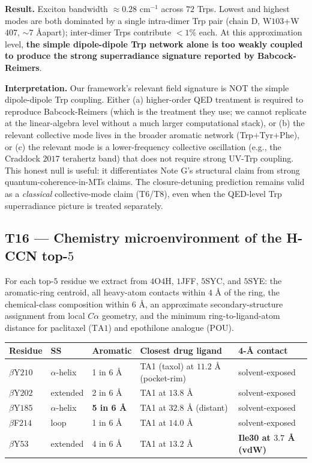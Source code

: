 \documentclass[11pt,a4paper]{article}
\begin{document}
\textbf{Result.} Exciton bandwidth $\approx 0.28$ cm$^{-1}$ across
$72$ Trps. Lowest and highest modes are both dominated by a single
intra-dimer Trp pair (chain D, W$103$+W$407$, $\sim 7$ \AA apart);
inter-dimer Trps contribute $< 1\%$ each. At this approximation
level, \textbf{the simple dipole-dipole Trp network alone is too
weakly coupled to produce the strong superradiance signature
reported by Babcock-Reimers}.

\textbf{Interpretation.} Our framework's relevant field signature is
NOT the simple dipole-dipole Trp coupling. Either (a) higher-order
QED treatment is required to reproduce Babcock-Reimers (which is the
treatment they use; we cannot replicate at the linear-algebra level
without a much larger computational stack), or (b) the relevant
collective mode lives in the broader aromatic network
(Trp$+$Tyr$+$Phe), or (c) the relevant mode is a lower-frequency
collective oscillation (e.g., the Craddock $2017$ terahertz band)
that does not require strong UV-Trp coupling. This honest null is
useful: it differentiates Note G's structural claim from strong
quantum-coherence-in-MTs claims. The closure-detuning prediction
remains valid as a \emph{classical} collective-mode claim
(T$6$/T$8$), even when the QED-level Trp superradiance picture is
treated separately.

\subsection{\textsf{T16} --- Chemistry microenvironment of the H-CCN top-$5$}\label{ssec:t16}

For each top-$5$ residue we extract from $4$O$4$H, $1$JFF, $5$SYC,
and $5$SYE: the aromatic-ring centroid, all heavy-atom contacts
within $4$ \AA{} of the ring, the chemical-class composition within
$6$ \AA, an approximate secondary-structure assignment from local
$C\alpha$ geometry, and the minimum ring-to-ligand-atom distance
for paclitaxel ($\mathrm{TA1}$) and epothilone analogue
($\mathrm{POU}$).

\begin{center}\small
\begin{tabular}{lllll}\toprule
Residue & SS & Aromatic & Closest drug ligand & 4-\AA{} contact \\\midrule
$\beta$Y$210$ & $\alpha$-helix & 1 in 6 \AA & TA1 (taxol) at $11.2$ \AA{} (pocket-rim) & solvent-exposed \\
$\beta$Y$202$ & extended & 2 in 6 \AA & TA1 at $13.8$ \AA{} & solvent-exposed \\
$\beta$Y$185$ & $\alpha$-helix & \textbf{5 in 6 \AA} & TA1 at $32.8$ \AA{} (distant) & solvent-exposed \\
$\beta$F$214$ & loop & 1 in 6 \AA & TA1 at $14.0$ \AA{} & solvent-exposed \\
$\beta$Y$53$  & extended & 4 in 6 \AA & TA1 at $13.2$ \AA{} & \textbf{Ile30 at $3.7$ \AA{} (vdW)} \\
\bottomrule\end{tabular}
\end{center}
\end{document}
